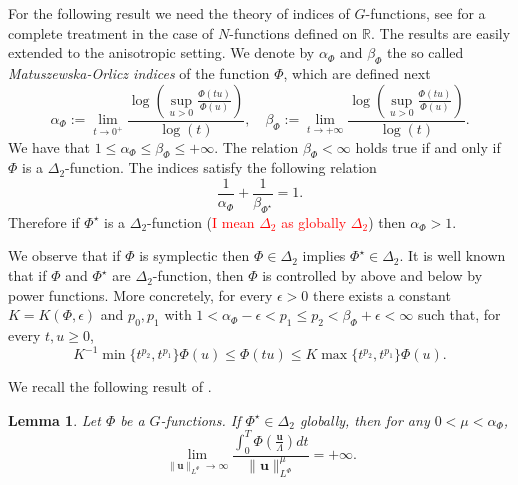 \documentclass[twoside]{article}
\newtheorem{lem}[thm]{Lemma}
\theoremstyle{remark}
\newcommand{\orlnor}{\|_{L^{\Phi}}}
\renewcommand{\b}[1]{\boldsymbol{#1}}
\newcommand{\rr}{\mathbb{R}}
\renewcommand{\leq}{\leqslant}
\renewcommand{\geq}{\geqslant}
\newcommand{\Phie}{\Phi^{\star}}
\begin{document}
 
For the following result we need the theory of indices of $G$-functions, see \cite{fiorenza1997indices,Maligranda} for a complete treatment in the case of $N$-functions defined on $\rr$. The results are easily extended to the anisotropic setting.
We denote by $\alpha_{\Phi}$ and $\beta_{\Phi}$ the so called  \emph{Matuszewska-Orlicz indices} of the function $\Phi$, which are defined next
\begin{equation}\label{eq:MO_indices}
    \alpha_{\Phi}:=\lim\limits_{t\to 0^{+}}\frac{\log \left (\sup\limits_{u>0}\frac{\Phi(t u)}{\Phi(u)} \right ) }{\log(t)},\quad
    \beta_{\Phi}:=\lim\limits_{t\to +\infty}\frac{\log \left  (\sup\limits_{u>0}\frac{\Phi(t u)}{\Phi(u)}\right )}{\log(t)}.
\end{equation}
We have that $1\leq \alpha_{\Phi}\leq \beta_{\Phi}\leq +\infty$. The relation $\beta_{\Phi}<\infty$ holds true if and only if $\Phi$ is a
$\Delta_2$-function. The indices satisfy the following relation
\begin{equation}\label{inv_indices}
    \frac{1}{\alpha_{\Phi}}+\frac{1}{\beta_{\Phie}}=1.
\end{equation}
Therefore if $\Phie$ is a $\Delta_2$-function (\textcolor{red}{I mean $\Delta_2$ as globally $\Delta_2$}) then $\alpha_{\Phi}>1$. 


We observe that if $\Phi$ is symplectic then $\Phi\in\Delta_2$ implies $\Phie\in\Delta_2$.  It is well known   that if $\Phi$  and $\Phie$ are $\Delta_2$-function, then $\Phi$ is controlled by above and below
 by power functions.  More concretely, for every $\epsilon>0$ there exists a
constant $K=K(\Phi,\epsilon)$ and $p_0,p_1$ with $1<\alpha_{\Phi}-\epsilon<p_1\leq p_2<\beta_{\Phi}+\epsilon<\infty$ such that, for every $t,u\geq 0$,
\begin{equation}\label{delta2-potencias}
    K^{-1}\min\big\{t^{p_2},t^{p_1} \big\}\Phi(u)\leq \Phi(t u)\leq
    K\max\big\{t^{p_2},t^{p_1} \big\}\Phi(u).
\end{equation}





We recall the following result of \cite{ABGMS2015}.

\begin{lem}\label{lem_coer} Let $\Phi$ be a  $G$-functions. If $\Phie \in \Delta_2$ globally, then  for any $0<\mu<\alpha_{\Phi}$,
\begin{equation}\label{coer_modular} \lim\limits_{\|\b{u}\orlnor \to \infty} \frac{\int_0^T\Phi\left(\frac{\b{u}}{\Lambda}\right)dt}{\|\b{u}\orlnor^{\mu}}=+\infty.
\end{equation}

\end{lem}
\end{document}

